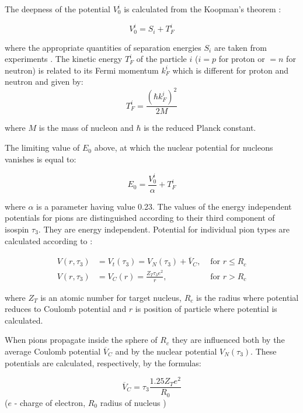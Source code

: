 The deepness of the potential $V_{0}^{i}$ is calculated from 
the Koopman's theorem \cite{KOOPMANS1934104}: 

\begin{equation}\label{V0}
	V_0^i = S_i + T_F^{i}
\end{equation}

where the appropriate quantities of separation energies $S_i$ are taken from experiments \cite{WAPSTRA198555}. 
The kinetic energy $T_F^{i}$ of the particle $i$ ($i = p$ for proton or $ = n$ for neutron) is related to its Fermi momentum $k_F^i$ which is different for proton and neutron and given by:
\begin{equation}\label{FKE}
	T_F^{i}=\frac{(\hbar k_F^i)^2}{2M}
\end{equation}

where $M$ is the mass of nucleon and $\hbar$ is the reduced Planck constant. 

The limiting value of $E_{0}$ above, at which the nuclear potential for nucleons vanishes is equal to:

\begin{equation}\label{E0}
E_0 = \frac{V_0^i}{\alpha} + T_F^i
\end{equation}
  
where $\alpha$  is a parameter having value 0.23. 
The values of the energy independent potentials for pions are distinguished according to their third component of isospin $\tau_3$. They are energy independent.
Potential for individual pion types are calculated according to \cite{Lane1962PhysRevLett}:

\begin{align}
	V\left(r,\tau_3\right)&=V_t(\tau_3)=V_N(\tau_3)+\overline{V}_C,& \text{ for } r \leq R_c \label{piopot}\\ 
	V\left(r,\tau_3\right)&=V_C(r)=\frac{Z_T\tau_3e^2}{r},& \text{ for } r > R_c 			\label{colpotpi}
\end{align}

where $Z_T$ is an atomic number for target nucleus,  $R_c$ is the radius where potential reduces to  Coulomb potential and $r$ is position of particle where potential is calculated.

When pions propagate inside the sphere of $R_c$ they are influenced both by the average Coulomb potential $\overline{V}_C$ 
and by the nuclear potential $V_N(\tau_3)$.
These potentials are calculated, respectively, by the formulas:

\begin{equation}\label{V_C}
	\overline{V}_C =\tau_3 \frac{1.25 Z_T e^2}{R_0}
\end{equation}
($e$ - charge of electron, $R_0$ radius of nucleus )

